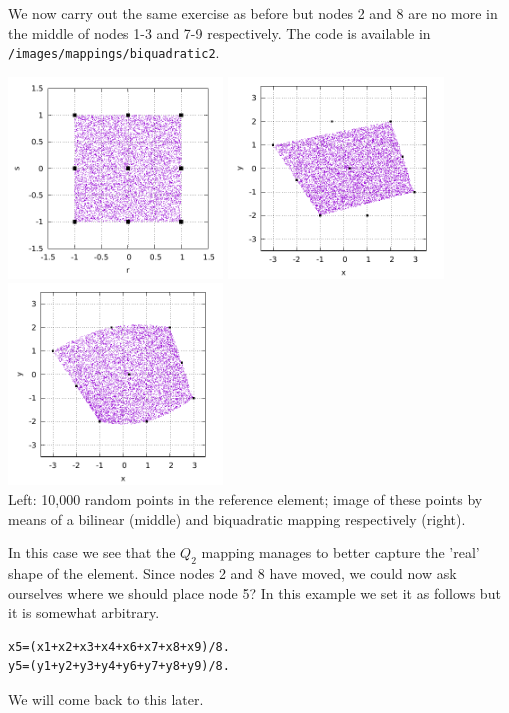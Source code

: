 We now carry out the same exercise as before but nodes 2 and 8 are no more 
in the middle of nodes 1-3 and 7-9 respectively.
The code is available in {\tt /images/mappings/biquadratic2}.

\begin{center}
\includegraphics[width=5.7cm]{images/mappings/biquadratic2/rs.pdf}
\includegraphics[width=5.7cm]{images/mappings/biquadratic2/xyQ1.pdf}
\includegraphics[width=5.7cm]{images/mappings/biquadratic2/xyQ2.pdf}\\
{\captionfont Left: 10,000 random points in the reference element; 
image of these points by means of a bilinear (middle) and biquadratic mapping 
respectively (right).} 
\end{center}

In this case we see that 
the $Q_2$ mapping manages to better capture the 'real' shape of the element.
Since nodes 2 and 8 have moved, we could now ask ourselves 
where we should place node 5? In this example we set it as follows
but it is somewhat arbitrary.
\begin{lstlisting}
x5=(x1+x2+x3+x4+x6+x7+x8+x9)/8. 
y5=(y1+y2+y3+y4+y6+y7+y8+y9)/8.
\end{lstlisting}
We will come back to this later.

